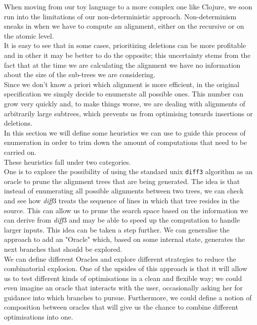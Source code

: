 \documentclass[11pt, titlepage]{article}
\newcommand{\diff}{\emph{diff}}
\begin{document}
When moving from our toy language to a more complex one like Clojure, we soon run into the limitations of our non-deterministic approach.
Non-determinism sneaks in when we have to compute an alignment, either on the recursive or on the atomic level. 
\\ 
It is easy to see that in some cases, prioritizing deletions can be more profitable and in other it may be better to do the opposite; this uncertainty stems from the fact that at the time we are calculating the alignment we have no information about the size of the sub-trees we are considering. 
\\
Since we don't know a priori which alignment is more efficient, in the original specification we simply decide to enumerate all possible ones. This number can grow very quickly and, to make things worse, we are dealing with alignments of arbitrarily large subtrees, which prevents
us from optimising towards insertions or deletions.
\\
In this section we will define some heuristics we can use to guide this process of enumeration in order to trim down the amount of computations that need to be carried on.
\\
These heuristics fall under two categories.
\\
One is to explore the possibility of using the standard unix \texttt{diff3} algorithm as an oracle to prune the alignment trees that are being generated. 
The idea is that instead of enumerating all possible alignments between two trees, we can check and see how \diff3 treats the sequence of lines in which that tree resides in the source. This can allow us to prune the search space based on the information we can derive from \diff3 and may be able to speed up the computation to handle larger inputs. This idea can be taken a step further. We can generalise the approach to add an "Oracle" which, based on some internal state, generates the next branches that should be explored.
\\
We can define different Oracles and explore different strategies to reduce the combinatorial explosion. 
One of the upsides of this approach is that it will allow us to test different kinds of optimisations in a clean and flexible way; we could even imagine an oracle that interacts with the user, occasionally asking her for guidance into which branches to pursue. 
Furthermore, we could define a notion of composition between oracles that will give us the chance to combine different optimisations into one.
\\
\end{document}
